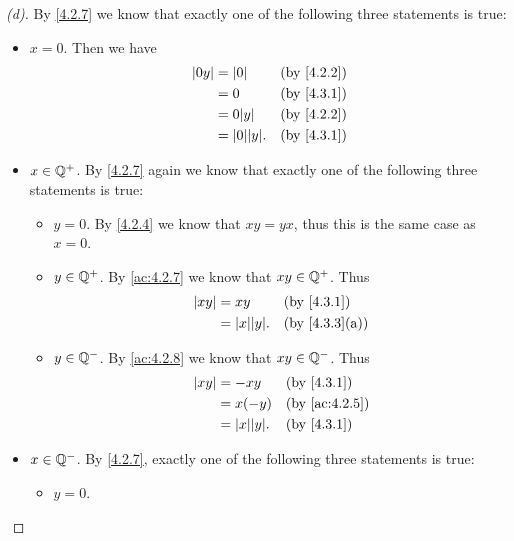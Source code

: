 \begin{proof}[(d)]
  By \cref{4.2.7} we know that exactly one of the following three statements is true:
  \begin{itemize}
    \item \(x = 0\).
          Then we have
          \begin{align*}
            \abs{0y} & = \abs{0}          &  & \by{4.2.2} \\
                     & = 0                &  & \by{4.3.1} \\
                     & = 0 \abs{y}        &  & \by{4.2.2} \\
                     & = \abs{0} \abs{y}. &  & \by{4.3.1}
          \end{align*}
    \item \(x \in \mathbb{Q}^+\).
          By \cref{4.2.7} again we know that exactly one of the following three statements is true:
          \begin{itemize}
            \item \(y = 0\).
                  By \cref{4.2.4} we know that \(xy = yx\), thus this is the same case as \(x = 0\).
            \item \(y \in \mathbb{Q}^+\).
                  By \cref{ac:4.2.7} we know that \(xy \in \mathbb{Q}^+\).
                  Thus
                  \begin{align*}
                    \abs{xy} & = xy               &  & \by{4.3.1}    \\
                             & = \abs{x} \abs{y}. &  & \by{4.3.3}[a]
                  \end{align*}
            \item \(y \in \mathbb{Q}^-\).
                  By \cref{ac:4.2.8} we know that \(xy \in \mathbb{Q}^-\).
                  Thus
                  \begin{align*}
                    \abs{xy} & = -xy              &  & \by{4.3.1}    \\
                             & = x(-y)            &  & \by{ac:4.2.5} \\
                             & = \abs{x} \abs{y}. &  & \by{4.3.1}    \\
                  \end{align*}
          \end{itemize}
    \item \(x \in \mathbb{Q}^-\).
          By \cref{4.2.7}, exactly one of the following three statements is true:
          \begin{itemize}
            \item \(y = 0\).

\end{itemize}
\end{itemize}
\end{proof}
